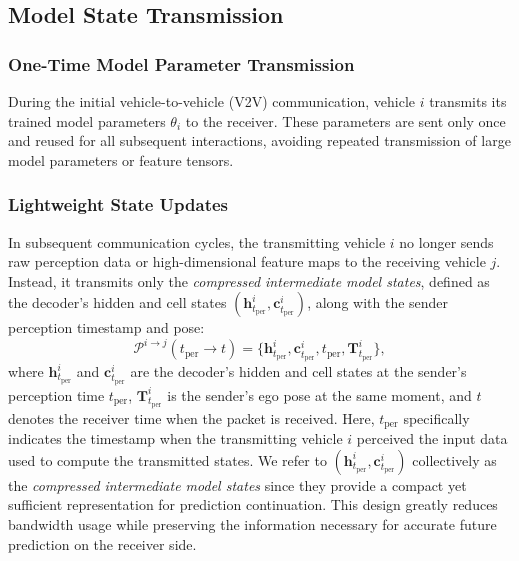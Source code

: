 \subsection{Model State Transmission}
\label{subsec:state}

\subsubsection{One-Time Model Parameter Transmission}
During the initial vehicle-to-vehicle (V2V) communication, vehicle $i$ transmits its trained model parameters $\theta_i$ to the receiver. These parameters are sent only once and reused for all subsequent interactions, avoiding repeated transmission of large model parameters or feature tensors.

\subsubsection{Lightweight State Updates}
In subsequent communication cycles, the transmitting vehicle \(i\) no longer sends raw perception data or high-dimensional feature maps to the receiving vehicle \(j\). 
Instead, it transmits only the \emph{compressed intermediate model states}, defined as the decoder’s hidden and cell states \((\mathbf{h}^i_{t_{\text{per}}},\mathbf{c}^i_{t_{\text{per}}})\), along with the sender perception timestamp and pose:
\begin{equation}
    \mathcal{P}^{i \rightarrow j}(t_{\text{per}}\!\to\!t) 
    = \{\mathbf{h}^i_{t_{\text{per}}}, \mathbf{c}^i_{t_{\text{per}}}, t_{\text{per}}, \mathbf{T}^i_{t_{\text{per}}}\},
\end{equation}
where \(\mathbf{h}^i_{t_{\text{per}}}\) and \(\mathbf{c}^i_{t_{\text{per}}}\) are the decoder’s hidden and cell states at the sender's perception time \(t_{\text{per}}\), 
\(\mathbf{T}^i_{t_{\text{per}}}\) is the sender’s ego pose at the same moment, and \(t\) denotes the receiver time when the packet is received.
Here, \(t_{\text{per}}\) specifically indicates the timestamp when the transmitting vehicle \(i\) perceived the input data used to compute the transmitted states.
We refer to \((\mathbf{h}^i_{t_{\text{per}}},\mathbf{c}^i_{t_{\text{per}}})\) collectively as the \emph{compressed intermediate model states} since they provide a compact yet sufficient representation for prediction continuation. 
This design greatly reduces bandwidth usage while preserving the information necessary for accurate future prediction on the receiver side. 

